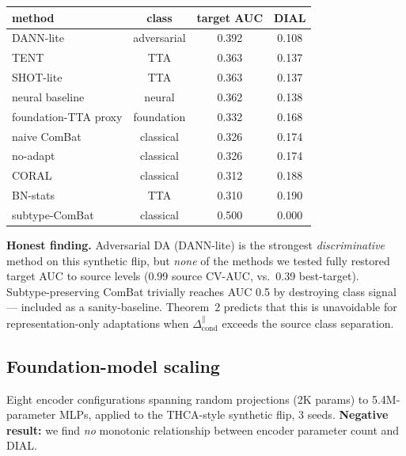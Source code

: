 \documentclass{article}
\begin{document}
\begin{center}
\begin{tabular}{lccc}
\toprule
method & class & target AUC & DIAL \\
\midrule
DANN-lite          & adversarial & 0.392 & 0.108 \\
TENT               & TTA          & 0.363 & 0.137 \\
SHOT-lite          & TTA          & 0.363 & 0.137 \\
neural baseline    & neural       & 0.362 & 0.138 \\
foundation-TTA proxy & foundation & 0.332 & 0.168 \\
naive ComBat       & classical    & 0.326 & 0.174 \\
no-adapt           & classical    & 0.326 & 0.174 \\
CORAL              & classical    & 0.312 & 0.188 \\
BN-stats           & TTA          & 0.310 & 0.190 \\
subtype-ComBat     & classical    & 0.500 & 0.000 \\
\bottomrule
\end{tabular}
\end{center}

\textbf{Honest finding.} Adversarial DA (DANN-lite) is the strongest
\emph{discriminative} method on this synthetic flip, but \emph{none}
of the methods we tested fully restored target AUC to source levels
(0.99 source CV-AUC, vs.\ 0.39 best-target). Subtype-preserving ComBat
trivially reaches AUC 0.5 by destroying class signal — included as a
sanity-baseline. Theorem~2 predicts that this is unavoidable for
representation-only adaptations when $\Delta_{\text{cond}}^{\parallel}$
exceeds the source class separation.

\subsection{Foundation-model scaling}

Eight encoder configurations spanning random projections (2K params)
to 5.4M-parameter MLPs, applied to the THCA-style synthetic flip,
$3$ seeds. \textbf{Negative result:} we find \emph{no} monotonic
relationship between encoder parameter count and DIAL.
\end{document}
